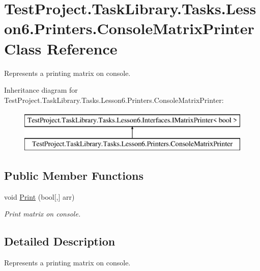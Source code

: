 \hypertarget{class_test_project_1_1_task_library_1_1_tasks_1_1_lesson6_1_1_printers_1_1_console_matrix_printer}{}\section{Test\+Project.\+Task\+Library.\+Tasks.\+Lesson6.\+Printers.\+Console\+Matrix\+Printer Class Reference}
\label{class_test_project_1_1_task_library_1_1_tasks_1_1_lesson6_1_1_printers_1_1_console_matrix_printer}


Represents a printing matrix on console.  


Inheritance diagram for Test\+Project.\+Task\+Library.\+Tasks.\+Lesson6.\+Printers.\+Console\+Matrix\+Printer\+:\begin{figure}[H]
\begin{center}
\leavevmode
\includegraphics[height=2.000000cm]{class_test_project_1_1_task_library_1_1_tasks_1_1_lesson6_1_1_printers_1_1_console_matrix_printer}
\end{center}
\end{figure}
\subsection*{Public Member Functions}
\begin{DoxyCompactItemize}
\item 
void \mbox{\hyperlink{class_test_project_1_1_task_library_1_1_tasks_1_1_lesson6_1_1_printers_1_1_console_matrix_printer_a1f65f008aaa8788eb677dd47829743fb}{Print}} (bool\mbox{[},\mbox{]} arr)
\begin{DoxyCompactList}\small\item\em Print matrix on console. \end{DoxyCompactList}\end{DoxyCompactItemize}


\subsection{Detailed Description}
Represents a printing matrix on console. 



